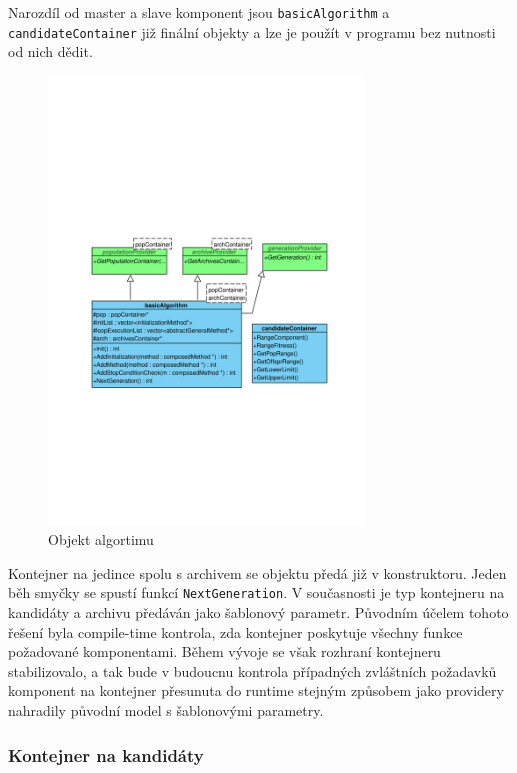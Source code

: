 Narozdíl od master a slave komponent jsou \texttt{basicAlgorithm} a \texttt{candidateContainer} již finální objekty a lze je použít v programu bez nutnosti od nich dědit.

\begin{figure}[h!]
\begin{center}
  \includegraphics[width=0.75\textwidth]{img/population}
  \caption{Objekt algortimu}\label{population}
  \end{center}
\end{figure}

Kontejner na jedince spolu s archivem se objektu předá již v konstruktoru. Jeden běh smyčky se spustí funkcí \texttt{NextGeneration}. V současnosti je typ kontejneru na kandidáty a archivu předáván jako šablonový parametr. Původním účelem tohoto řešení byla compile-time kontrola, zda kontejner poskytuje všechny funkce požadované komponentami. Během vývoje se však rozhraní kontejneru stabilizovalo, a tak bude v budoucnu kontrola případných zvláštních požadavků komponent na kontejner přesunuta do runtime stejným způsobem jako providery nahradily původní model s šablonovými parametry.

\subsubsection{Kontejner na kandidáty}

